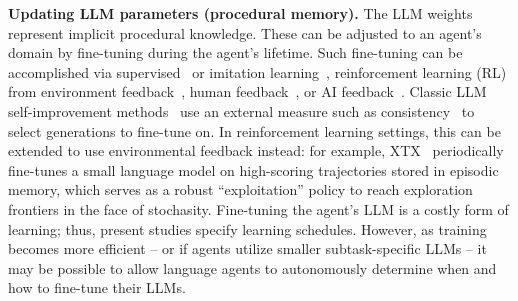 \documentclass[10pt]{article} %
\begin{document}
\textbf{Updating LLM parameters (procedural memory).} The LLM weights represent implicit procedural knowledge. These can be adjusted to an agent's domain by fine-tuning during the agent's lifetime. Such fine-tuning can be accomplished via supervised~\citep{liu2023languages, zhang2023wisdom} or imitation learning~\citep{hussein2017imitation}, reinforcement learning (RL) from environment feedback~\citep{sutton2018reinforcement}, human feedback~\citep[RLHF;][]{christiano2017deep, ouyang2022training, nakano2021webgpt}, or AI feedback~\citep{bai2022constitutional, liu2023training}. Classic LLM self-improvement methods~\citep{huang2022large, zelikman2022star} use an external measure such as consistency~\cite{wang2022self} to select generations to fine-tune on. In reinforcement learning settings, this can be extended to use environmental feedback instead: for example, XTX~\citep{tuyls2022multi} periodically fine-tunes a small language model on high-scoring trajectories stored in episodic memory, which serves as a robust ``exploitation'' policy to reach exploration frontiers in the face of stochasity. Fine-tuning the agent's LLM is a costly form of learning; thus, present studies specify learning schedules. However, as training becomes more efficient -- or if agents utilize smaller subtask-specific LLMs -- it may be possible to allow language agents to autonomously determine when and how to fine-tune their LLMs.
\end{document}
